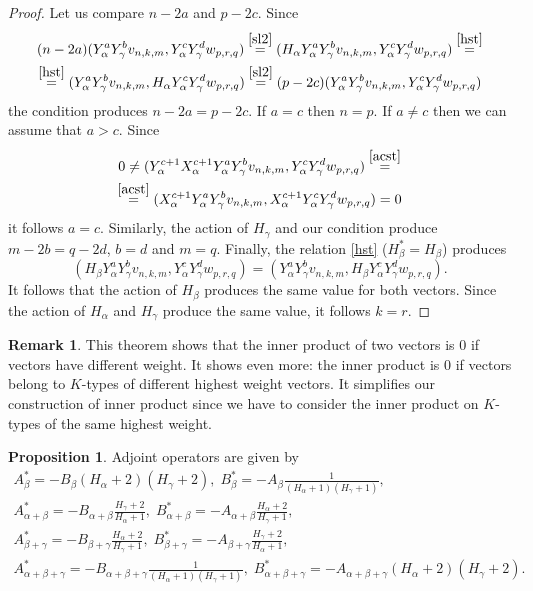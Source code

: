 \documentclass[twoside,a4paper,12pt]{article}
\theoremstyle{definition}
\newtheorem{remark}{Remark}
\newtheorem{proposition}{Proposition}
\begin{document}
\begin{proof}
	Let us compare $n-2a$ and $p-2c$. Since
	\begin{gather*}
		(n-2a)(Y_\alpha^aY_\gamma^bv_{n,k,m},Y_\alpha^cY_\gamma^dw_{p,r,q})
		\stackrel{\eqref{sl2}}{=}
		(H_\alpha Y_\alpha^aY_\gamma^bv_{n,k,m},Y_\alpha^cY_\gamma^dw_{p,r,q})
		\stackrel{\eqref{hst}}{=}\\
		\stackrel{\eqref{hst}}{=}
		(Y_\alpha^aY_\gamma^bv_{n,k,m},H_\alpha Y_\alpha^cY_\gamma^dw_{p,r,q})
		\stackrel{\eqref{sl2}}{=}
		(p-2c)(Y_\alpha^aY_\gamma^bv_{n,k,m},Y_\alpha^cY_\gamma^dw_{p,r,q})
	\end{gather*}
	the condition produces $n-2a=p-2c$. If $a=c$ then $n=p$. If $a\neq c$ then
	we can assume that $a>c$. Since
	\begin{gather*}
		0\neq(Y_\alpha^{c+1}X_\alpha^{c+1}Y_\alpha^aY_\gamma^bv_{n,k,m},
		Y_\alpha^cY_\gamma^dw_{p,r,q})\stackrel{\eqref{acst}}{=}\\
		\stackrel{\eqref{acst}}{=}(X_\alpha^{c+1}Y_\alpha^aY_\gamma^bv_{n,k,m},
		X_\alpha^{c+1}Y_\alpha^cY_\gamma^dw_{p,r,q})=0
	\end{gather*}
	it follows $a=c$.
	Similarly, the action of $H_\gamma$ and our condition produce $m-2b=q-2d$,
	$b=d$ and $m=q$.
	Finally, the relation \eqref{hst} ($H_\beta^*=H_\beta$) produces
	\begin{equation*}
		(H_\beta Y_\alpha^aY_\gamma^bv_{n,k,m},Y_\alpha^cY_\gamma^dw_{p,r,q})=
		(Y_\alpha^aY_\gamma^bv_{n,k,m},H_\beta Y_\alpha^cY_\gamma^dw_{p,r,q}).
	\end{equation*}
	It follows that the action of $H_\beta$ produces the same value for both
	vectors. Since the action of $H_\alpha$ and $H_\gamma$ produce the
	same value, it follows $k=r$.
\end{proof}

\begin{remark}\label{innind}
	This theorem shows that the inner product of two vectors is 0 if vectors
	have different weight. It shows even more: the inner product is 0 if
	vectors belong to $K$-types of different highest weight vectors.
	It simplifies our construction of inner product since we have to consider
	the inner product on $K$-types of the same highest weight.
\end{remark}

\begin{proposition}\label{star}
	Adjoint operators are given by
	\begin{gather*}
		A_\beta^*=-B_\beta(H_\alpha+2)(H_\gamma+2),\;
		B_\beta^*=-A_\beta\frac1{(H_\alpha+1)(H_\gamma+1)},\\
		A_{\alpha+\beta}^*=-B_{\alpha+\beta}\frac{H_\gamma+2}{H_\alpha+1},\;
		B_{\alpha+\beta}^*=-A_{\alpha+\beta}\frac{H_\alpha+2}{H_\gamma+1},\\
		A_{\beta+\gamma}^*=-B_{\beta+\gamma}\frac{H_\alpha+2}{H_\gamma+1},\;
		B_{\beta+\gamma}^*=-A_{\beta+\gamma}\frac{H_\gamma+2}{H_\alpha+1},\\
		A_{\alpha+\beta+\gamma}^*=
			-B_{\alpha+\beta+\gamma}\frac1{(H_\alpha+1)(H_\gamma+1)},\;
		B_{\alpha+\beta+\gamma}^*=
			-A_{\alpha+\beta+\gamma}(H_\alpha+2)(H_\gamma+2).
	\end{gather*}
\end{proposition}
\end{document}
